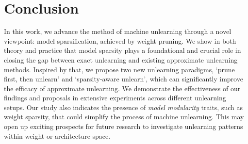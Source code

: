 \section{Conclusion}
In this work, we advance the method of {machine unlearning} through a novel viewpoint: model sparsification, achieved by weight pruning. We show in both theory and practice that model sparsity plays a foundational and crucial role in closing the gap between exact unlearning and existing approximate unlearning methods. Inspired by that, we propose two new unlearning paradigms,  `prune first, then unlearn' and `sparsity-aware unlearn', which can significantly improve the efficacy of approximate unlearning. We demonstrate the effectiveness of our findings and proposals in extensive experiments across different unlearning setups. Our study also indicates the presence of \textit{model modularity} traits, such as weight sparsity, that could simplify the process of machine unlearning. This may open up exciting prospects for future research to investigate unlearning patterns within weight or architecture space.




